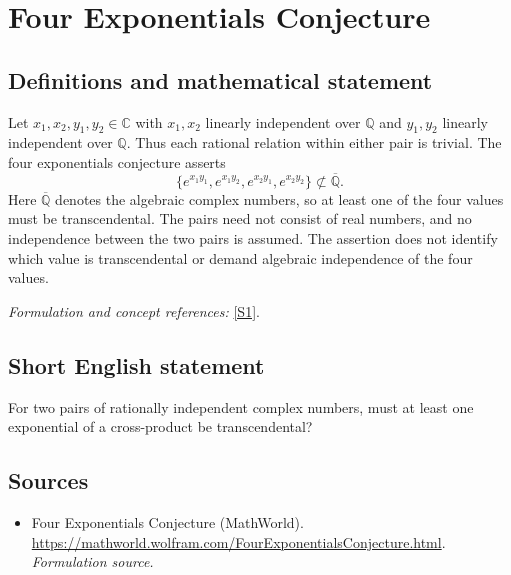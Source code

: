 \documentclass[11pt]{article}
\begin{document}
\section*{\texorpdfstring{Four Exponentials Conjecture}{Four Exponentials Conjecture}}\label{1281}
\subsection{Definitions and mathematical statement}
Let $x_1,x_2,y_1,y_2\in{\mathbb{C}}$ with $x_1,x_2$ linearly independent over ${\mathbb{Q}}$ and $y_1,y_2$ linearly independent over ${\mathbb{Q}}$. Thus each rational relation within either pair is trivial. The four exponentials conjecture asserts
\[
 \{e^{x_1y_1},e^{x_1y_2},e^{x_2y_1},e^{x_2y_2}\}
 \not\subset\overline{{\mathbb{Q}}}.
\]
Here $\overline{{\mathbb{Q}}}$ denotes the algebraic complex numbers, so at least one of the four values must be transcendental. The pairs need not consist of real numbers, and no independence between the two pairs is assumed. The assertion does not identify which value is transcendental or demand algebraic independence of the four values.
\par\smallskip\textit{Formulation and concept references:} \href{https://mathworld.wolfram.com/FourExponentialsConjecture.html}{[S1]}.

\subsection{Short English statement}
For two pairs of rationally independent complex numbers, must at least one exponential of a cross-product be transcendental?
\subsection{Sources}
\begin{itemize}
\item[S1]Four Exponentials Conjecture (MathWorld).
\url{https://mathworld.wolfram.com/FourExponentialsConjecture.html}.
\textit{Formulation source.}
\end{itemize}
\end{document}
